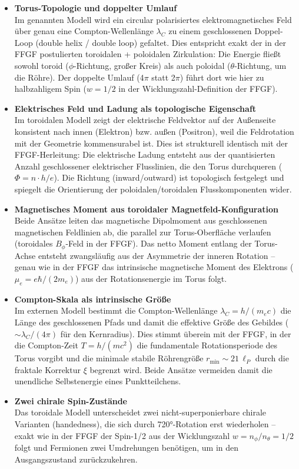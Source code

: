 \documentclass[12pt,a4paper]{article}
\begin{document}
	\begin{itemize}
		\item \textbf{Torus-Topologie und doppelter Umlauf}\\
		Im genannten Modell wird ein circular polarisiertes elektromagnetisches Feld über genau eine Compton-Wellenlänge $\lambda_C$ zu einem geschlossenen Doppel-Loop (double helix / double loop) gefaltet. Dies entspricht exakt der in der FFGF postulierten toroidalen + poloidalen Zirkulation: Die Energie fließt sowohl toroid ($\phi$-Richtung, großer Kreis) als auch poloidal ($\theta$-Richtung, um die Röhre). Der doppelte Umlauf (4$\pi$ statt 2$\pi$) führt dort wie hier zu halbzahligem Spin ($w = 1/2$ in der Wicklungszahl-Definition der FFGF).
		
		\item \textbf{Elektrisches Feld und Ladung als topologische Eigenschaft}\\
		Im toroidalen Modell zeigt der elektrische Feldvektor auf der Außenseite konsistent nach innen (Elektron) bzw. außen (Positron), weil die Feldrotation mit der Geometrie kommensurabel ist. Dies ist strukturell identisch mit der FFGF-Herleitung: Die elektrische Ladung entsteht aus der quantisierten Anzahl geschlossener elektrischer Flusslinien, die den Torus durchqueren ($\Phi = n \cdot h/e$). Die Richtung (inward/outward) ist topologisch festgelegt und spiegelt die Orientierung der poloidalen/toroidalen Flusskomponenten wider.
		
		\item \textbf{Magnetisches Moment aus toroidaler Magnetfeld-Konfiguration}\\
		Beide Ansätze leiten das magnetische Dipolmoment aus geschlossenen magnetischen Feldlinien ab, die parallel zur Torus-Oberfläche verlaufen (toroidales $B_\phi$-Feld in der FFGF). Das netto Moment entlang der Torus-Achse entsteht zwangsläufig aus der Asymmetrie der inneren Rotation – genau wie in der FFGF das intrinsische magnetische Moment des Elektrons ($\mu_e = e\hbar / (2m_e)$) aus der Rotationsenergie im Torus folgt.
		
		\item \textbf{Compton-Skala als intrinsische Größe}\\
		Im externen Modell bestimmt die Compton-Wellenlänge $\lambda_C = h/(m_ec)$ die Länge des geschlossenen Pfads und damit die effektive Größe des Gebildes ($\sim \lambda_C / (4\pi)$ für den Kernradius). Dies stimmt überein mit der FFGF, in der die Compton-Zeit $T = h/(m c^2)$ die fundamentale Rotationsperiode des Torus vorgibt und die minimale stabile Röhrengröße $r_{\min} \sim 21\,\ell_P$ durch die fraktale Korrektur $\xi$ begrenzt wird. Beide Ansätze vermeiden damit die unendliche Selbstenergie eines Punktteilchens.
		
		\item \textbf{Zwei chirale Spin-Zustände}\\
		Das toroidale Modell unterscheidet zwei nicht-superponierbare chirale Varianten (handedness), die sich durch 720°-Rotation erst wiederholen – exakt wie in der FFGF der Spin-1/2 aus der Wicklungszahl $w = n_\phi / n_\theta = 1/2$ folgt und Fermionen zwei Umdrehungen benötigen, um in den Ausgangszustand zurückzukehren.
	\end{itemize}
	
\end{document}
